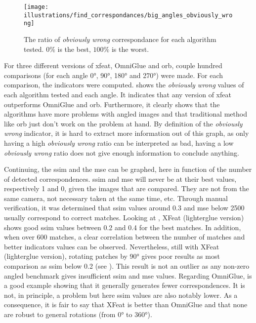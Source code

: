 \begin{figure}[ht!]
    \centering
    \texttt{[image: illustrations/find\_correspondances/big\_angles\_obviously\_wrong]}
    \caption{The ratio of \textit{obviously wrong} correspondance for each algorithm tested.
        $0\%$ is the best, $100\%$ is the worst.}
    \label{fig:find_corr:big_angles:obviously_wrong}
\end{figure}

For three different versions of xfeat, OmniGlue and orb, couple hundred comparisons (for each angle 0°, 90°, 180° and 270°) were made.
For each comparison, the indicators were computed.
 shows the \textit{obviously wrong} values of each algorithm tested and each angle.
It indicates that any version of xfeat outperforms OmniGlue and orb.
Furthermore, it clearly shows that the algorithms have more problems with angled images and that traditional method like orb just don't work on the problem at hand.
By definition of the \textit{obviously wrong} indicator, it is hard to extract more information out of this graph, as only having
a high \textit{obviously wrong} ratio can be interpreted as bad, having a low \textit{obviously wrong} ratio does not give enough
information to conclude anything.

Continuing, the \gls{ssim} and the \gls{mse} can be graphed, here in function of the number of detected correspondences.
\gls{ssim} and \gls{mse} will never be at their best values, respectively 1 and 0, given the images that are compared.
They are not from the same camera, not necessary taken at the same time, etc.
Through manual verification, it was determined that \gls{ssim} values around 0.3 and \gls{mse} below 2500 usually correspond
to correct matches.
Looking at , XFeat (lighterglue version) shows good \gls{ssim} values
between 0.2 and 0.4 for the best matches.
In addition, when over 600 matches, a clear correlation between the number of matches and better indicators values
can be observed.
Nevertheless, still with XFeat (lighterglue version), rotating patches by 90° gives poor results as most comparison as
\gls{ssim} below 0.2 (see ).
This result is not an outlier as any non-zero angled benchmark gives insufficient \gls{ssim} and \gls{mse} values.
Regarding OmniGlue,  is a good example showing that it generally generates fewer correspondences.
It is not, in principle, a problem but here \gls{ssim} values are also notably lower.
As a consequence, it is fair to say that XFeat is better than OmniGlue and that none are robust to general rotations (from 0° to 360°).

